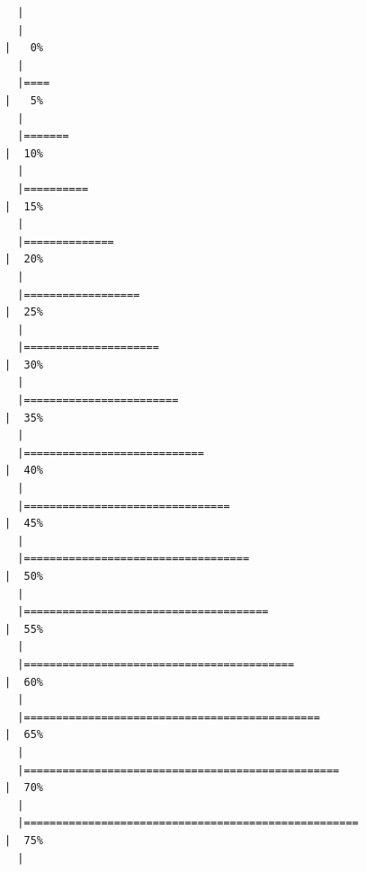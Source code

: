 \documentclass[
  letterpaper,
  DIV=11,
  numbers=noendperiod]{scrartcl}
\begin{document}
\begin{verbatim}
  |                                                                            
  |                                                                      |   0%
  |                                                                            
  |====                                                                  |   5%
  |                                                                            
  |=======                                                               |  10%
  |                                                                            
  |==========                                                            |  15%
  |                                                                            
  |==============                                                        |  20%
  |                                                                            
  |==================                                                    |  25%
  |                                                                            
  |=====================                                                 |  30%
  |                                                                            
  |========================                                              |  35%
  |                                                                            
  |============================                                          |  40%
  |                                                                            
  |================================                                      |  45%
  |                                                                            
  |===================================                                   |  50%
  |                                                                            
  |======================================                                |  55%
  |                                                                            
  |==========================================                            |  60%
  |                                                                            
  |==============================================                        |  65%
  |                                                                            
  |=================================================                     |  70%
  |                                                                            
  |====================================================                  |  75%
  |                                                                            

\end{verbatim}
\end{document}
